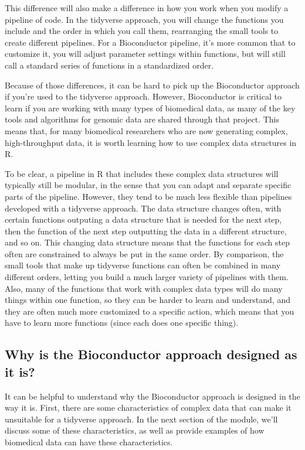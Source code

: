 \documentclass[]{tufte-book}
\begin{document}
This difference will also make a difference in how you work when you modify a
pipeline of code. In the tidyverse approach, you will change the functions you
include and the order in which you call them, rearranging the small tools to
create different pipelines. For a Bioconductor pipeline, it's more common that
to customize it, you will adjust parameter settings within functions, but will
still call a standard series of functions in a standardized order.

Because of those differences, it can be hard to pick up the Bioconductor
approach if you're used to the tidyverse approach. However, Bioconductor is
critical to learn if you are working with many types of biomedical data, as many
of the key tools and algorithms for genomic data are shared through that
project. This means that, for many biomedical researchers who are now generating
complex, high-throughput data, it is worth learning how to use complex data
structures in R.

To be clear, a pipeline in R that includes these complex data structures
will typically still be modular, in the sense that you can adapt and
separate specific parts of the pipeline. However, they tend to be much
less flexible than pipelines developed with a tidyverse approach. The
data structure changes often, with certain functions outputing a data
structure that is needed for the next step, then the function of the
next step outputting the data in a different structure, and so on. This
changing data structure means that the functions for each step often are
constrained to always be put in the same order. By comparison, the small
tools that make up tidyverse functions can often be combined in many different
orders, letting you build a much larger variety of pipelines with them.
Also, many of the functions that work with complex data types will do
many things within one function, so they can be harder to learn and
understand, and they are often much more customized to a specific action,
which means that you have to learn more functions (since each does one
specific thing).

\subsection{Why is the Bioconductor approach designed as it is?}\label{why-is-the-bioconductor-approach-designed-as-it-is}

It can be helpful to understand why the Bioconductor approach is designed
in the way it is. First, there are some characteristics of complex data
that can make it unsuitable for a tidyverse approach. In the next section
of the module, we'll discuss some of these characteristics, as well as
provide examples of how biomedical data can have these characteristics.
\end{document}
